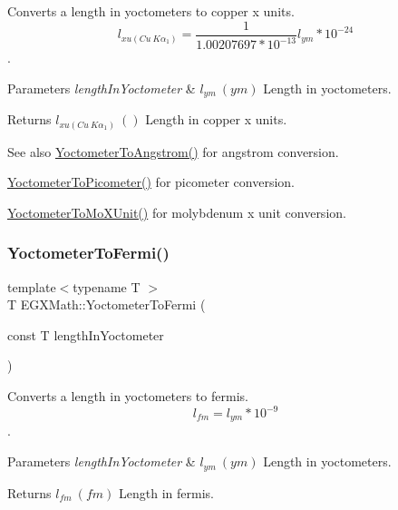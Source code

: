 Converts a length in yoctometers to copper x units. \[ l_{xu(Cu\ K\alpha_1)}= \frac{1}{1.00207697*10^{-13}} l_{ym} * 10^{-24}\]. 


\begin{DoxyParams}{Parameters}
{\em length\+In\+Yoctometer} & $ l_{ym}\ (ym)$ Length in yoctometers. \\
\hline
\end{DoxyParams}
\begin{DoxyReturn}{Returns}
$ l_{xu(Cu\ K\alpha_1)}\ ()$ Length in copper x units. 
\end{DoxyReturn}
\begin{DoxySeeAlso}{See also}
\mbox{\hyperlink{group___e_g_x_math-_conversions-_length_conversions-_yoctometer-_non-_s_i_ga1189896c419175e90e23cea9d8f6b52a}{Yoctometer\+To\+Angstrom()}} for angstrom conversion. 

\mbox{\hyperlink{group___e_g_x_math-_conversions-_length_conversions-_yoctometer-_s_i_gab621b78b78d6776131912bd6038901b9}{Yoctometer\+To\+Picometer()}} for picometer conversion. 

\mbox{\hyperlink{group___e_g_x_math-_conversions-_length_conversions-_yoctometer-_non-_s_i_ga6a6a1fb3ecc97e377fc728c03327048e}{Yoctometer\+To\+Mo\+X\+Unit()}} for molybdenum x unit conversion. 
\end{DoxySeeAlso}
\mbox{\label{group___e_g_x_math-_conversions-_length_conversions-_yoctometer-_non-_s_i_gadcf3b93b00bf0d160f27d3a1a4b8ed9f}} 
\subsubsection{\texorpdfstring{Yoctometer\+To\+Fermi()}{YoctometerToFermi()}}
{\footnotesize\ttfamily template$<$typename T $>$ \\
T E\+G\+X\+Math\+::\+Yoctometer\+To\+Fermi (\begin{DoxyParamCaption}\item[{const T}]{length\+In\+Yoctometer }\end{DoxyParamCaption})}



Converts a length in yoctometers to fermis. \[ l_{fm}=l_{ym} * 10^{-9} \]. 


\begin{DoxyParams}{Parameters}
{\em length\+In\+Yoctometer} & $ l_{ym}\ (ym)$ Length in yoctometers. \\
\hline
\end{DoxyParams}
\begin{DoxyReturn}{Returns}
$ l_{fm}\ (fm)$ Length in fermis. 
\end{DoxyReturn}
\mbox{\label{group___e_g_x_math-_conversions-_length_conversions-_yoctometer-_non-_s_i_ga4863fe4d5268ab023ec32d0281171b55}} 
